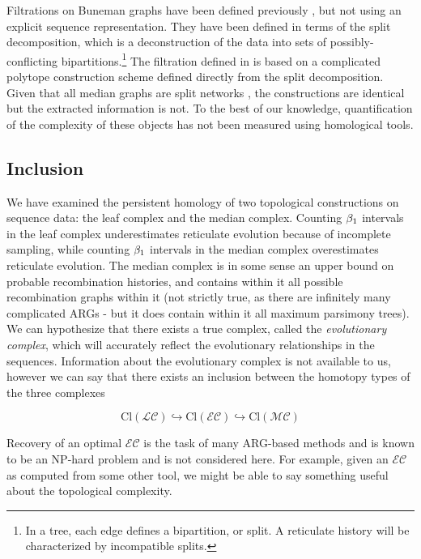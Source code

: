 Filtrations on Buneman graphs have been defined previously \citep{Dress:1997}, but not using an explicit sequence representation.
They have been defined in terms of the split decomposition, which is a deconstruction of the data into sets of possibly-conflicting bipartitions.\footnote{In a tree, each edge defines a bipartition, or split. A reticulate history will be characterized by incompatible splits.}
The filtration defined in \citet{Dress:1997} is based on a complicated polytope construction scheme defined directly from the split decomposition.
Given that all median graphs are split networks \citep{Huson:2010}, the constructions are identical but the extracted information is not.
To the best of our knowledge, quantification of the complexity of these objects has not been measured using homological tools.

\subsection{Inclusion}
%
We have examined the persistent homology of two topological constructions on sequence data: the leaf complex and the median complex.
Counting $\beta_1$ intervals in the leaf complex underestimates reticulate evolution because of incomplete sampling, while counting $\beta_1$ intervals in the median complex overestimates reticulate evolution.
The median complex is in some sense an upper bound on probable recombination histories, and contains within it all possible recombination graphs within it (not strictly true, as there are infinitely many complicated ARGs - but it does contain within it all maximum parsimony trees).
We can hypothesize that there exists a true complex, called the \emph{evolutionary complex}, which will accurately reflect the evolutionary relationships in the sequences.
Information about the evolutionary complex is not available to us, however we can say that there exists an inclusion between the homotopy types of the three complexes

\begin{equation}
 \mathrm{Cl}(\mathcal{LC}) \hookrightarrow \mathrm{Cl}(\mathcal{EC}) \hookrightarrow \mathrm{Cl}(\mathcal{MC})
\end{equation}

Recovery of an optimal $\mathcal{EC}$ is the task of many ARG-based methods and is known to be an NP-hard problem and is not considered here.
For example, given an $\mathcal{EC}$ as computed from some other tool, we might be able to say something useful about the topological complexity.

